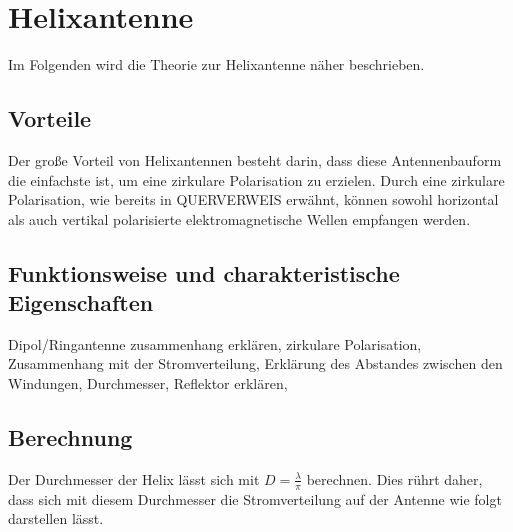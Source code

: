 \section{Helixantenne}
Im Folgenden wird die Theorie zur Helixantenne näher beschrieben.

\subsection{Vorteile}
Der große Vorteil von Helixantennen besteht darin, dass diese Antennenbauform die einfachste ist, um eine zirkulare Polarisation zu erzielen. Durch eine zirkulare Polarisation, wie bereits in QUERVERWEIS erwähnt, können sowohl horizontal als auch vertikal polarisierte elektromagnetische Wellen empfangen werden.

\subsection{Funktionsweise und charakteristische Eigenschaften}
Dipol/Ringantenne zusammenhang erklären, zirkulare Polarisation, Zusammenhang mit der Stromverteilung, Erklärung des Abstandes zwischen den Windungen, Durchmesser, Reflektor erklären,



\subsection{Berechnung}
Der Durchmesser der Helix lässt sich mit $D=\frac{\lambda}{\pi}$ berechnen. Dies rührt daher, dass sich mit diesem Durchmesser die Stromverteilung auf der Antenne wie folgt darstellen lässt.